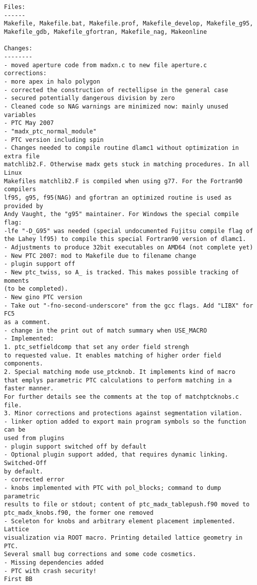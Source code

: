 \begin{verbatim}
Files:
------
Makefile, Makefile.bat, Makefile.prof, Makefile_develop, Makefile_g95,
Makefile_gdb, Makefile_gfortran, Makefile_nag, Makeonline

Changes:
--------
- moved aperture code from madxn.c to new file aperture.c
corrections:
- more apex in halo polygon
- corrected the construction of rectellipse in the general case
- secured potentially dangerous division by zero
- Cleaned code so NAG warnings are minimized now: mainly unused variables
- PTC May 2007
- "madx_ptc_normal_module"
- PTC version including spin
- Changes needed to compile routine dlamc1 without optimization in extra file
matchlib2.F. Otherwise madx gets stuck in matching procedures. In all Linux
Makefiles matchlib2.F is compiled when using g77. For the Fortran90 compilers
lf95, g95, f95(NAG) and gfortran an optimized routine is used as provided by
Andy Vaught, the "g95" maintainer. For Windows the special compile flag:
-lfe "-D_G95" was needed (special undocumented Fujitsu compile flag of
the Lahey lf95) to compile this special Fortran90 version of dlamc1.
- Adjustments to produce 32bit executables on AMD64 (not complete yet)
- New PTC 2007: mod to Makefile due to filename change
- plugin support off
- New ptc_twiss, so A_ is tracked. This makes possible tracking of moments 
(to be completed).
- New gino PTC version
- Take out "-fno-second-underscore" from the gcc flags. Add "LIBX" for FC5
as a comment.
- change in the print out of match summary when USE_MACRO
- Implemented:
1. ptc_setfieldcomp that set any order field strengh
to requested value. It enables matching of higher order field components.
2. Special matching mode use_ptcknob. It implements kind of macro
that emplys parametric PTC calculations to perform matching in a faster manner.
For further details see the comments at the top of matchptcknobs.c file.
3. Minor corrections and protections against segmentation vilation.
- linker option added to export main program symbols so the function can be 
used from plugins
- plugin support switched off by default
- Optional plugin support added, that requires dynamic linking. Switched-Off 
by default.
- corrected error
- knobs implemented with PTC with pol_blocks; command to dump parametric 
results to file or stdout; content of ptc_madx_tablepush.f90 moved to 
ptc_madx_knobs.f90, the former one removed
- Sceleton for knobs and arbitrary element placement implemented. Lattice 
visualization via ROOT macro. Printing detailed lattice geometry in PTC. 
Several small bug corrections and some code cosmetics.
- Missing dependencies added
- PTC with crash security!
First BB


\end{verbatim}
